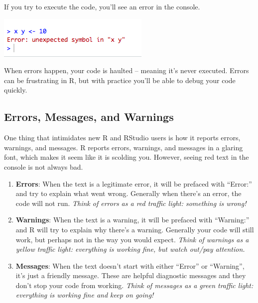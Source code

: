\documentclass[]{book}
\begin{document}
If you try to execute the code, you'll see an error in the console.

\begin{center}\includegraphics[width=0.7\linewidth]{img/error} \end{center}

When errors happen, your code is haulted -- meaning it's never executed.
Errors can be frustrating in R, but with practice you'll be able to
debug your code quickly.

\subsection{Errors, Messages, and
Warnings}\label{errors-messages-and-warnings}

One thing that intimidates new R and RStudio users is how it reports
errors, warnings, and messages. R reports errors, warnings, and messages
in a glaring font, which makes it seem like it is scolding you. However,
seeing red text in the console is not always bad.

\begin{enumerate}
\def\labelenumi{\arabic{enumi}.}
\item
  \textbf{Errors}: When the text is a legitimate error, it will be
  prefaced with ``Error:'' and try to explain what went wrong. Generally
  when there's an error, the code will not run. \emph{Think of errors as
  a red traffic light: something is wrong!}
\item
  \textbf{Warnings}: When the text is a warning, it will be prefaced
  with ``Warning:'' and R will try to explain why there's a warning.
  Generally your code will still work, but perhaps not in the way you
  would expect. \emph{Think of warnings as a yellow traffic light:
  everything is working fine, but watch out/pay attention.}
\item
  \textbf{Messages}: When the text doesn't start with either ``Error''
  or ``Warning'', it's just a friendly message. These are helpful
  diagnostic messages and they don't stop your code from working.
  \emph{Think of messages as a green traffic light: everything is
  working fine and keep on going!}
\end{enumerate}
\end{document}
